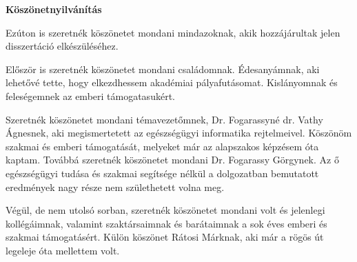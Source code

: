 \vspace{3cm}

\centerline{\Large{\textbf{Köszönetnyilvánítás}}}

\vspace{2.5cm}

Ezúton is szeretnék köszönetet mondani mindazoknak, akik hozzájárultak jelen disszertáció elkészüléséhez.

Először is szeretnék köszönetet mondani családomnak. Édesanyámnak, aki lehetővé tette, hogy elkezdhessem akadémiai pályafutásomat. Kislányomnak és feleségemnek az emberi támogatasukért.

Szeretnék köszönetet mondani témavezetőmnek, Dr. Fogarassyné dr. Vathy Ágnesnek, aki megismertetett az egészségügyi informatika rejtelmeivel. Köszönöm szakmai és emberi támogatását, melyeket már az alapszakos képzésem óta kaptam. Továbbá szeretnék köszönetet mondani Dr. Fogarassy Görgynek. Az ő egészségügyi tudása és szakmai segítsége nélkül a dolgozatban bemutatott eredmények nagy része nem születhetett volna meg.

Végül, de nem utolsó sorban, szeretnék köszönetet mondani volt és jelenlegi kollégáimnak, valamint szaktársaimnak és barátaimnak a sok éves emberi és szakmai támogatásért. Külön köszönet Rátosi Márknak, aki már a rögös út legeleje óta mellettem volt.